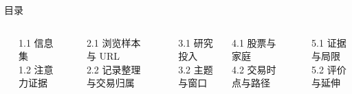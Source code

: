 \begin{frame}[label=agenda]{目录}
  \begin{columns}[T,onlytextwidth]
    \textbf{}\par
    {\small 1.1 信息集\\1.2 注意力证据}\par\medskip
    \textbf{}\par
    {\small 2.1 浏览样本与 URL\\2.2 记录整理与交易归属}\par\medskip
    \textbf{}\par
    {\small 3.1 研究投入\\3.2 主题与窗口}
    \textbf{}\par
    {\small 4.1 股票与家庭\\4.2 交易时点与路径}\par\medskip
    \textbf{}\par
    {\small 5.1 证据与局限\\5.2 评价与延伸}
  \end{columns}
\end{frame}
